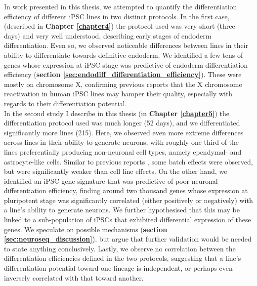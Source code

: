 In work presented in this thesis, we attempted to quantify the differentiation efficiency of different iPSC lines in two distinct protocols.
In the first case, (described in \textbf{Chapter 
\ref{chapter4}})
the protocol used was very short (three days) and very well understood, describing early stages of endoderm differentiation.
Even so, we observed noticeable differences between lines in their ability to differentiate towards definitive endoderm.
We identified a few tens of
genes whose expression at iPSC stage was predictive of endoderm differentiation efficiency (\textbf{section \ref{sec:endodiff_differentiation_efficiency}}).
These were mostly on chromosome X, confirming previous reports that the X chromosome reactivation in human iPSC lines may hamper their quality, especially with regards to their differentiation potential.\\

In the second study I describe in this thesis (in \textbf{Chapter \ref{chapter5}})
the differentiation protocol used was much longer (52 days), and we differentiated significantly more lines (215).
Here, we observed even more extreme differences across lines in their ability to generate neurons, with roughly one third of the lines preferentially producing non-neuronal cell types, namely ependymal- and astrocyte-like cells.
Similar to previous reports \cite{schwartzentruber2018molecular}, some batch effects were observed, but were significantly weaker than cell line effects.
On the other hand, we identified an iPSC gene signature that was predictive of poor neuronal differentiation efficiency, finding around two thousand genes whose expression at pluripotent stage was significantly correlated (either positively or negatively) with a line's ability to generate neurons. 
We further hypothesised that this may be linked to a sub-population of iPSCs that exhibited differential expression of these genes.
We speculate on possible mechanisms (\textbf{section
\ref{sec:neuroseq_discussion}}),
but argue that further validation would be needed to state anything conclusively.
Lastly, we observe no correlation between the differentiation efficiencies defined in the two protocols, suggesting that a line's differentiation potential toward one lineage is independent, or perhaps even inversely correlated with that toward another. \\

